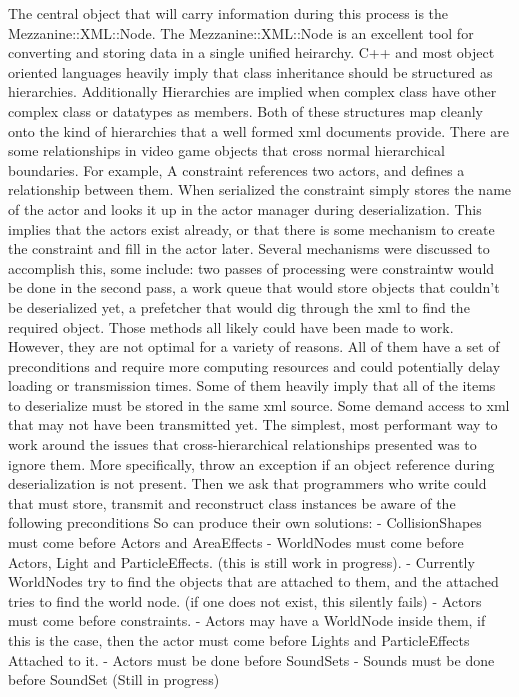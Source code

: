 \begin{DoxyVerb}
   The central object that will carry information during this process is the Mezzanine::XML::Node. The Mezzanine::XML::Node is an excellent
   tool for converting and storing data in a single unified heirarchy.
   \n \n
   C++ and most object oriented languages heavily imply that class inheritance should be structured as hierarchies. Additionally
   Hierarchies are implied when complex class have other complex class or datatypes as members. Both of these structures map
   cleanly onto the kind of hierarchies that a well formed xml documents provide.
   \n \n
   There are some relationships in video game objects that cross normal hierarchical boundaries. For example, A constraint
   references two actors, and defines a relationship between them. When serialized the constraint simply stores the name of
   the actor and looks it up in the actor manager during deserialization. This implies that the actors exist already, or that
   there is some mechanism to create the constraint and fill in the actor later. Several mechanisms were discussed to
   accomplish this, some include: two passes of processing were constraintw would be done in the second pass, a work queue that
   would store objects that couldn't be deserialized yet, a prefetcher that would dig through the xml to find the required
   object.
   \n \n
   Those methods all likely could have been made to work. However, they are not optimal for a variety of reasons. All of them
   have a set of preconditions and require more computing resources and could potentially delay loading or transmission times.
   Some of them heavily imply that all of the items to deserialize must be stored in the same xml source. Some demand access to
   xml that may not have been transmitted yet.
   \n \n
   The simplest, most performant way to work around the issues that cross-hierarchical relationships presented was to ignore
   them. More specifically, throw an exception if an object reference during deserialization is not present. Then we ask that
   programmers who write could that must store, transmit and reconstruct class instances be aware of the following preconditions
   So can produce their own solutions:
       - CollisionShapes must come before Actors and AreaEffects
       - WorldNodes must come before Actors, Light and ParticleEffects. (this is still work in progress).
           - Currently WorldNodes try to find the objects that are attached to them, and the attached tries to find the world node. (if one does not exist, this silently fails)
       - Actors must come before constraints.
       - Actors may have a WorldNode inside them, if this is the case, then the actor must come before Lights and ParticleEffects Attached to it.
       - Actors must be done before SoundSets
       - Sounds must be done before SoundSet (Still in progress)


\end{DoxyVerb}
